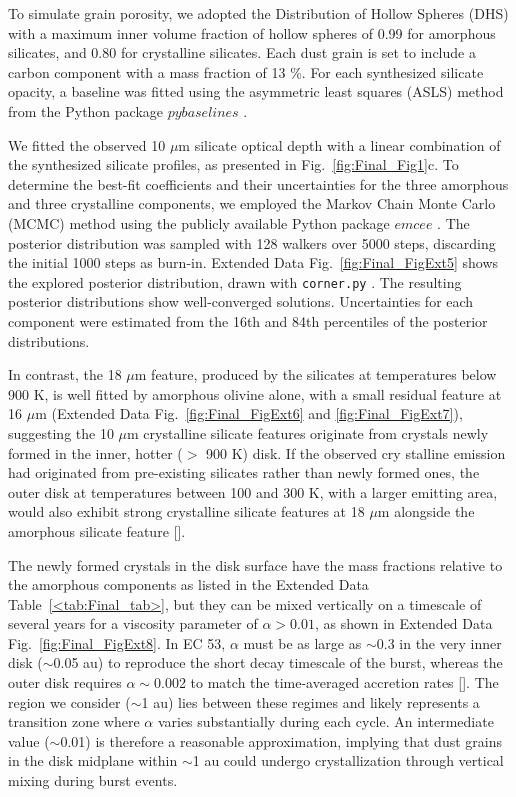 \documentclass[pdflatex,sn-mathphys-num]{sn-jnl}
\theoremstyle{thmstyleone}
\theoremstyle{thmstyletwo}
\theoremstyle{thmstylethree}
\begin{document}
\begin{bibunit}
To simulate grain porosity, we adopted the Distribution of Hollow Spheres (DHS) \citep{Min2005} with a maximum inner volume fraction of hollow spheres of 0.99 for amorphous silicates, and 0.80 for crystalline silicates. Each dust grain is set to include a carbon component with a mass fraction of 13 \%.
For each synthesized silicate opacity, a baseline was fitted using the asymmetric least squares (ASLS) method from the Python package $pybaselines$ \cite{pybaselines}. \par
We fitted the observed 10 $\mu$m silicate optical depth with a linear combination of the synthesized silicate profiles, as presented in Fig.~\ref{fig:Final_Fig1}c. To determine the best-fit coefficients and their uncertainties for the three amorphous and three crystalline components, we employed the Markov Chain Monte Carlo (MCMC) method using the publicly available Python package $emcee$ \citep{emcee}. The posterior distribution was sampled with 128 walkers over 5000 steps, discarding the initial 1000 steps as burn-in. Extended Data Fig.~\ref{fig:Final_FigExt5} shows the explored posterior distribution, drawn with \lstinline{corner.py} \citep{corner}. The resulting posterior distributions show well-converged solutions. Uncertainties for each component were estimated from the 16th and 84th percentiles of the posterior distributions.

In contrast, the 18 $\mu$m feature, produced by the silicates at temperatures below 900 K, is well fitted by amorphous olivine alone, with a small residual feature at 16 $\mu$m (Extended Data Fig.~\ref{fig:Final_FigExt6} and \ref{fig:Final_FigExt7}), suggesting the 10 $\mu$m crystalline silicate features originate from crystals newly formed in the inner, hotter ($>$ 900 K) disk.
If the observed cry stalline emission had originated from pre-existing silicates rather than newly formed ones, the outer disk at temperatures between 100 and 300 K, with a larger emitting area, would also exhibit strong crystalline silicate features at 18 $\mu$m alongside the amorphous silicate feature [].

The newly formed crystals in the disk surface have the mass fractions relative to the amorphous components as listed in the Extended Data Table~\ref{<tab:Final_tab>}, but they can be mixed vertically on a timescale of several years for a viscosity parameter of $\alpha > 0.01$, as shown in Extended Data Fig.~\ref{fig:Final_FigExt8}.
In EC 53, $\alpha$ must be as large as $\sim$0.3 in the very inner disk ($\sim$0.05 au) to reproduce the short decay timescale of the burst, whereas the outer disk requires $\alpha \sim$0.002 to match the time-averaged accretion rates []. The region we consider ($\sim$1 au) lies between these regimes and likely represents a transition zone where $\alpha$ varies substantially during each cycle. An intermediate value ($\sim$0.01) is therefore a reasonable approximation, implying that dust grains in the disk midplane within $\sim$1 au could undergo crystallization through vertical mixing during burst events.


\end{bibunit}
\end{document}
